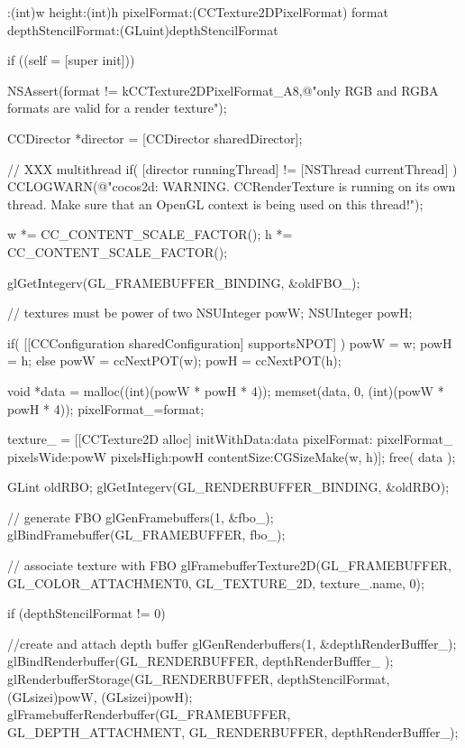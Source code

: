 \begin{DoxyCode}
                  :(int)w height:(int)h pixelFormat:(CCTexture2DPixelFormat) 
      format depthStencilFormat:(GLuint)depthStencilFormat
{
        if ((self = [super init]))
        {
                NSAssert(format != kCCTexture2DPixelFormat_A8,@"only RGB and
       RGBA formats are valid for a render texture");

                CCDirector *director = [CCDirector sharedDirector];

                // XXX multithread
                if( [director runningThread] != [NSThread currentThread] )
                        CCLOGWARN(@"cocos2d: WARNING. CCRenderTexture is
       running on its own thread. Make sure that an OpenGL context is being used on this
       thread!");

                
                w *= CC_CONTENT_SCALE_FACTOR();
                h *= CC_CONTENT_SCALE_FACTOR();

                glGetIntegerv(GL_FRAMEBUFFER_BINDING, &oldFBO_);

                // textures must be power of two
                NSUInteger powW;
                NSUInteger powH;

                if( [[CCConfiguration sharedConfiguration] supportsNPOT] ) {
                        powW = w;
                        powH = h;
                } else {
                        powW = ccNextPOT(w);
                        powH = ccNextPOT(h);
                }

                void *data = malloc((int)(powW * powH * 4));
                memset(data, 0, (int)(powW * powH * 4));
                pixelFormat_=format;

                texture_ = [[CCTexture2D alloc] initWithData:data pixelFormat:
      pixelFormat_ pixelsWide:powW pixelsHigh:powH contentSize:CGSizeMake(w, h)];
                free( data );

                GLint oldRBO;
                glGetIntegerv(GL_RENDERBUFFER_BINDING, &oldRBO);

                // generate FBO
                glGenFramebuffers(1, &fbo_);
                glBindFramebuffer(GL_FRAMEBUFFER, fbo_);

                // associate texture with FBO
                glFramebufferTexture2D(GL_FRAMEBUFFER, GL_COLOR_ATTACHMENT0, 
      GL_TEXTURE_2D, texture_.name, 0);

                if (depthStencilFormat != 0) {
                        //create and attach depth buffer
                        glGenRenderbuffers(1, &depthRenderBufffer_);
                        glBindRenderbuffer(GL_RENDERBUFFER, depthRenderBufffer_
      );
                        glRenderbufferStorage(GL_RENDERBUFFER, 
      depthStencilFormat, (GLsizei)powW, (GLsizei)powH);
                        glFramebufferRenderbuffer(GL_FRAMEBUFFER, 
      GL_DEPTH_ATTACHMENT, GL_RENDERBUFFER, depthRenderBufffer_);

}}}
\end{DoxyCode}
